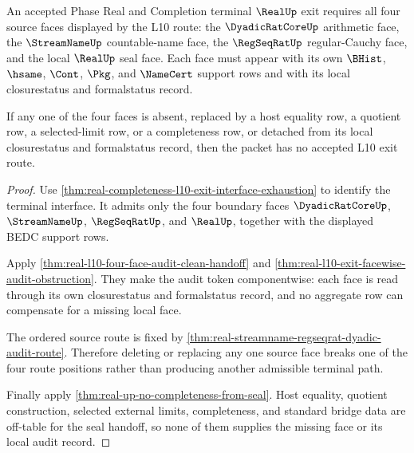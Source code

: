 \begin{theorem}
\label{thm:real-l10-incomplete-face-exit-obstruction}
An accepted Phase Real and Completion terminal $\RealUp$ exit requires all four source faces displayed by the L10 route: the $\DyadicRatCoreUp$ arithmetic face, the $\StreamNameUp$ countable-name face, the $\RegSeqRatUp$ regular-Cauchy face, and the local $\RealUp$ seal face. Each face must appear with its own $\BHist$, $\hsame$, $\Cont$, $\Pkg$, and $\NameCert$ support rows and with its local closurestatus and formalstatus record.

If any one of the four faces is absent, replaced by a host equality row, a quotient row, a selected-limit row, or a completeness row, or detached from its local closurestatus and formalstatus record, then the packet has no accepted L10 exit route.
\end{theorem}
\begin{proof}
Use \autoref{thm:real-completeness-l10-exit-interface-exhaustion} to identify the terminal interface. It admits only the four boundary faces $\DyadicRatCoreUp$, $\StreamNameUp$, $\RegSeqRatUp$, and $\RealUp$, together with the displayed BEDC support rows.

Apply \autoref{thm:real-l10-four-face-audit-clean-handoff} and \autoref{thm:real-l10-exit-facewise-audit-obstruction}. They make the audit token componentwise: each face is read through its own closurestatus and formalstatus record, and no aggregate row can compensate for a missing local face.

The ordered source route is fixed by \autoref{thm:real-streamname-regseqrat-dyadic-audit-route}. Therefore deleting or replacing any one source face breaks one of the four route positions rather than producing another admissible terminal path.

Finally apply \autoref{thm:real-up-no-completeness-from-seal}. Host equality, quotient construction, selected external limits, completeness, and standard bridge data are off-table for the seal handoff, so none of them supplies the missing face or its local audit record.
\end{proof}


